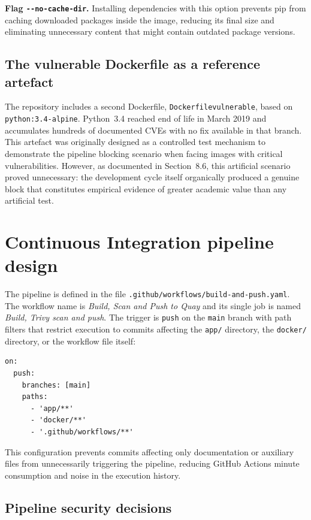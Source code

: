 \textbf{Flag \texttt{-{}-no-cache-dir}.} Installing dependencies with this option prevents pip from caching downloaded packages inside the image, reducing its final size and eliminating unnecessary content that might contain outdated package versions.

\subsection{The vulnerable Dockerfile as a reference artefact}

The repository includes a second Dockerfile, \texttt{Dockerfilevulnerable}, based on \texttt{python:3.4-alpine}. Python~3.4 reached end of life in March 2019 and accumulates hundreds of documented CVEs with no fix available in that branch. This artefact was originally designed as a controlled test mechanism to demonstrate the pipeline blocking scenario when facing images with critical vulnerabilities. However, as documented in Section~8.6, this artificial scenario proved unnecessary: the development cycle itself organically produced a genuine block that constitutes empirical evidence of greater academic value than any artificial test.

\section{Continuous Integration pipeline design}
\label{sec:pipeline-design}

The pipeline is defined in the file \texttt{.github/workflows/build-and-push.yaml}. The workflow name is \textit{Build, Scan and Push to Quay} and its single job is named \textit{Build, Trivy scan and push}. The trigger is \texttt{push} on the \texttt{main} branch with path filters that restrict execution to commits affecting the \texttt{app/} directory, the \texttt{docker/} directory, or the workflow file itself:

\begin{lstlisting}
on:
  push:
    branches: [main]
    paths:
      - 'app/**'
      - 'docker/**'
      - '.github/workflows/**'
\end{lstlisting}

This configuration prevents commits affecting only documentation or auxiliary files from unnecessarily triggering the pipeline, reducing GitHub Actions minute consumption and noise in the execution history.

\subsection{Pipeline security decisions}

